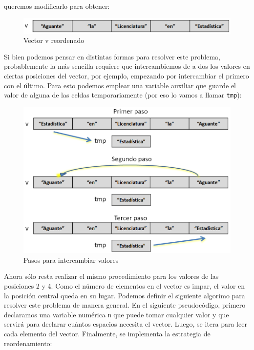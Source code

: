 \documentclass[
]{book}
\begin{document}
queremos modificarlo para obtener:

\begin{figure}

{\centering \includegraphics[width=0.8\linewidth]{images/05_estructuras/estr12} 

}

\caption{Vector v reordenado}\label{fig:inv2}
\end{figure}

Si bien podemos pensar en distintas formas para resolver este problema, probablemente la más sencilla requiere que intercambiemos de a dos los valores en ciertas posiciones del vector, por ejemplo, empezando por intercambiar el primero con el último. Para esto podemos emplear una variable auxiliar que guarde el valor de alguna de las celdas temporariamente (por eso lo vamos a llamar \texttt{tmp}):

\begin{figure}

{\centering \includegraphics[width=0.8\linewidth]{images/05_estructuras/estr13} 

}

\caption{Pasos para intercambiar valores}\label{fig:inv3}
\end{figure}

Ahora sólo resta realizar el mismo procedimiento para los valores de las posiciones 2 y 4. Como el número de elementos en el vector es impar, el valor en la posición central queda en su lugar. Podemos definir el siguiente algorimo para resolver este problema de manera general. En el siguiente pseudocódigo, primero declaramos una variable numérica \texttt{n} que puede tomar cualquier valor y que servirá para declarar cuántos espacios necesita el vector. Luego, se itera para leer cada elemento del vector. Finalmente, se implementa la estrategia de reordenamiento:
\end{document}
